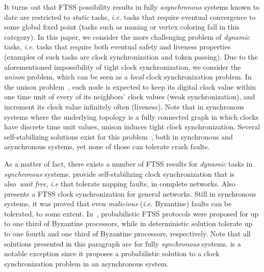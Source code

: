 \documentclass[11pt,english,letterpaper]{article}
\begin{document}
It turns out that FTSS possibility results in fully \emph{asynchronous} systems known to date are restricted to \emph{static} tasks, \emph{i.e.} tasks that require eventual convergence to some global fixed point (tasks such as naming or vertex coloring fall in this category). In this paper, we consider the more challenging problem of \emph{dynamic} tasks, \emph{i.e.} tasks that require both eventual safety and liveness properties (examples of such tasks are clock synchronization and token passing). Due to the aforementioned impossibility of tight clock synchronization, we consider the \emph{unison} problem, which can be seen as a \emph{local} clock synchronization problem. In the unison problem~\cite{M91j}, each node is expected to keep its digital clock value within one time unit of every of its neighbors' clock values (weak synchronization), and increment its clock value infinitely often (liveness). Note that in synchronous systems where the underlying topology is a fully connected graph in which clocks have discrete time unit values, unison induces tight clock synchronization. Several self-stabilizing solutions exist for this problem~\cite{BPV04c,BPV05c,CFG92c,GH90j}, both in synchronous and asynchronous systems, yet none of those can tolerate crash faults.

As a matter of fact, there exists a number of FTSS results for \emph{dynamic} tasks in \emph{synchronous} systems. \cite{DW97j,PT97j} provide self-stabilizing clock synchronization that is also~\emph{wait free}, \emph{i.e} that tolerate napping faults, in complete networks. Also \cite{D97j} presents a FTSS clock synchronization for general networks. Still in synchronous systems, it was proved that even \emph{malicious} (\emph{i.e.} Byzantine) faults can be tolerated, to some extent. In~\cite{BDH08c,DW04j}, probabilistic FTSS protocols were proposed for up to one third of Byzantine processors, while in \cite{DH07cb,HDD06c} deterministic solution tolerate up to one fourth and one third of Byzantine processors, respectively. Note that all solutions presented in this paragraph are for fully \emph{synchronous} systems. \cite{HBD10c} is a notable exception since it proposes a probabilistic solution to a clock synchronization problem in an asynchronous system.  
\end{document}
